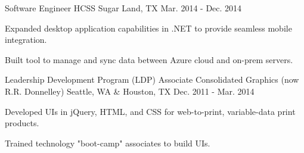 \begin{cventries}
\cventry
{Software Engineer} %
{HCSS} %
{Sugar Land, TX} %
{Mar. 2014 - Dec. 2014} %
{ %
\begin{cvitems}
\item {Expanded desktop application capabilities in .NET to provide seamless mobile integration.}
\item {Built tool to manage and sync data between Azure cloud and on-prem servers.}
\end{cvitems}
}


\cventry
{Leadership Development Program (LDP) Associate} %
{Consolidated Graphics (now R.R. Donnelley)} %
{Seattle, WA \& Houston, TX} %
{Dec. 2011 - Mar. 2014} %
{ %
\begin{cvitems}
\item {Developed UIs in jQuery, HTML, and CSS for web-to-print, variable-data print products.}
\item {Trained technology "boot-camp" associates to build UIs.}
\end{cvitems}
}

\end{cventries}
